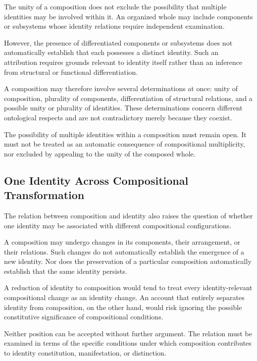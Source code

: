 The unity of a composition does not exclude the possibility
that multiple identities may be involved within it.
An organized whole may include components or subsystems
whose identity relations require independent examination.

However, the presence of differentiated components
or subsystems does not automatically establish that
each possesses a distinct identity. Such an attribution
requires grounds relevant to identity itself rather than
an inference from structural or functional differentiation.

A composition may therefore involve several determinations
at once: unity of composition, plurality of components,
differentiation of structural relations, and a possible
unity or plurality of identities. These determinations
concern different ontological respects and are not
contradictory merely because they coexist.

The possibility of multiple identities within a composition
must remain open. It must not be treated as an automatic
consequence of compositional multiplicity, nor excluded
by appealing to the unity of the composed whole.

\subsection{One Identity Across Compositional Transformation}

The relation between composition and identity also raises
the question of whether one identity may be associated
with different compositional configurations.

A composition may undergo changes in its components,
their arrangement, or their relations. Such changes
do not automatically establish the emergence of a new
identity. Nor does the preservation of a particular
composition automatically establish that the same
identity persists.

A reduction of identity to composition would tend to
treat every identity-relevant compositional change as
an identity change. An account that entirely separates
identity from composition, on the other hand, would
risk ignoring the possible constitutive significance
of compositional conditions.

Neither position can be accepted without further argument.
The relation must be examined in terms of the specific
conditions under which composition contributes to
identity constitution, manifestation, or distinction.

